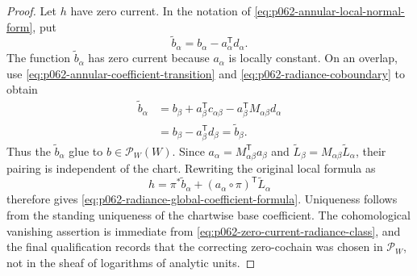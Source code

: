\begin{proof}
Let $h$ have zero current.  In the notation of
\eqref{eq:p062-annular-local-normal-form}, put
\[
 \widetilde b_\alpha=b_\alpha-a_\alpha^{\mathsf T}d_\alpha.
\]
The function $\widetilde b_\alpha$ has zero current because $a_\alpha$ is
locally constant.  On an overlap, use
\eqref{eq:p062-annular-coefficient-transition} and
\eqref{eq:p062-radiance-coboundary} to obtain
\begin{align*}
 \widetilde b_\alpha
 &=b_\beta+a_\beta^{\mathsf T}c_{\alpha\beta}
   -a_\beta^{\mathsf T}M_{\alpha\beta}d_\alpha\\
 &=b_\beta-a_\beta^{\mathsf T}d_\beta
 =\widetilde b_\beta.
\end{align*}
Thus the $\widetilde b_\alpha$ glue to
$b\in\mathscr P_W(W)$.  Since
$a_\alpha=M_{\alpha\beta}^{\mathsf T}a_\beta$ and
$\widetilde L_\beta=M_{\alpha\beta}\widetilde L_\alpha$, their pairing is
independent of the chart.  Rewriting the original local formula as
\[
 h=\pi^*\widetilde b_\alpha
   +(a_\alpha\circ\pi)^{\mathsf T}\widetilde L_\alpha
\]
therefore gives \eqref{eq:p062-radiance-global-coefficient-formula}.
Uniqueness follows from the standing uniqueness of the chartwise base
coefficient.  The cohomological
vanishing assertion is immediate from
\eqref{eq:p062-zero-current-radiance-class}, and the final qualification
records that the correcting zero-cochain was chosen in $\mathscr P_W$, not
in the sheaf of logarithms of analytic units.
\end{proof}
